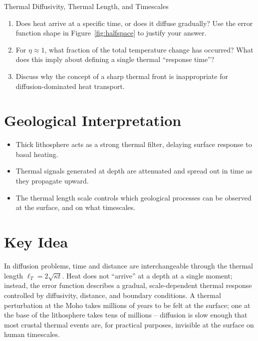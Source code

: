 \begin{activity}{Thermal Diffusivity, Thermal Length, and Timescales}
\begin{questions}
\begin{enumerate}[label=(\alph*)]
  \item Does heat arrive at a specific time, or does it diffuse gradually? Use the error function shape in Figure~\ref{fig:halfspace} to justify your answer.
  \answerbox[2cm]

  \item For $\eta \approx 1$, what fraction of the total temperature change has occurred? What does this imply about defining a single thermal ``response time''?
  \answerbox[2cm]

  \item Discuss why the concept of a sharp thermal front is inappropriate for diffusion-dominated heat transport.
  \answerbox[2cm]
\end{enumerate}

\end{questions}

\section*{Geological Interpretation}

\begin{itemize}
  \item Thick lithosphere acts as a strong thermal filter, delaying surface response to basal heating.
  \item Thermal signals generated at depth are attenuated and spread out in time as they propagate upward.
  \item The thermal length scale controls which geological processes can be observed at the surface, and on what timescales.
\end{itemize}

\section*{Key Idea}

In diffusion problems, time and distance are interchangeable through the thermal length $\ell_T = 2\sqrt{\kappa t}$. Heat does not ``arrive'' at a depth at a single moment; instead, the error function describes a gradual, scale-dependent thermal response controlled by diffusivity, distance, and boundary conditions. A thermal perturbation at the Moho takes millions of years to be felt at the surface; one at the base of the lithosphere takes tens of millions -- diffusion is slow enough that most crustal thermal events are, for practical purposes, invisible at the surface on human timescales.

\end{activity}
